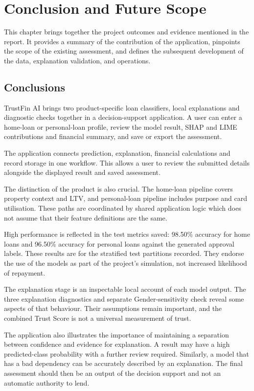 \chapter[CONCLUSION AND FUTURE SCOPE]{Conclusion and Future Scope}

This chapter brings together the project outcomes and evidence mentioned in the report. It provides a summary of the contribution of the application, pinpoints the scope of the existing assessment, and defines the subsequent development of the data, explanation validation, and operations.

\section{Conclusions}
TrustFin AI brings two product-specific loan classifiers, local explanations and diagnostic checks together in a decision-support application. A user can enter a home-loan or personal-loan profile, review the model result, SHAP and LIME contributions and financial summary, and save or export the assessment.

The application connects prediction, explanation, financial calculations and record storage in one workflow. This allows a user to review the submitted details alongside the displayed result and saved assessment.

The distinction of the product is also crucial. The home-loan pipeline covers property context and LTV, and personal-loan pipeline includes purpose and card utilisation. These paths are coordinated by shared application logic which does not assume that their feature definitions are the same.

High performance is reflected in the test metrics saved: 98.50\% accuracy for home loans and 96.50\% accuracy for personal loans against the generated approval labels. These results are for the stratified test partitions recorded. They endorse the use of the models as part of the project's simulation, not increased likelihood of repayment.

The explanation stage is an inspectable local account of each model output. The three explanation diagnostics and separate Gender-sensitivity check reveal some aspects of that behaviour. Their assumptions remain important, and the combined Trust Score is not a universal measurement of trust.

The application also illustrates the importance of maintaining a separation between confidence and evidence for explanation. A result may have a high predicted-class probability with a further review required. Similarly, a model that has a bad dependency can be accurately described by an explanation. The final assessment should then be an output of the decision support and not an automatic authority to lend.

